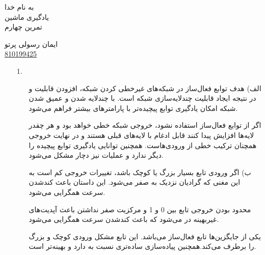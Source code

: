 \documentclass[a4paper]{article}
\begin{document}
\begin{center}
	\large
	 به نام خدا\\
 یادگیری ماشین\\
 تمرین چهارم
 
 \normalsize
 ایمان رسولی پرتو\\
 \underline{810199425}
\end{center}
\begin{itemize}
	\item [1.] ‌
	\begin{itemize}
		\item[الف)]
		هدف توابع فعال‌ساز در شبکه‌های 
		غیرخطی کردن شبکه، افزودن قابلیت 
		و در نتیجه ایجاد قابلیت چند‌لایه‌سازی شبکه است. با چندلایه شدن و عمیق شدن شبکه امکان یادگیری توابع پیچیده‌تر با پارامترهای بیشتر فراهم می‌شود.
		
		اگر از توابع فعال‌ساز استفاده نشود، خروجی شبکه خطی خواهد بود و هر چقدر لایه‌ها افزایش پیدا کنند قابل ادغام با لایه‌های قبلی هستند و در نهایت خروجی همچنان ترکیب خطی از ورودی‌هاست. همچنین توانایی یادگیری توابع پیچیده را دیگر ندارد و عملیات 
		نیز دچار مشکل می‌شود.
	\item[ب)]
	اگر ورودی تابع
	بسیار بزرگ یا کوچک باشد، تغییرات خروجی کم است به این مغنی که گرادیان نزدیک به صفر می‌شود. این داستان باعث کندشدن سرعت همگرایی می‌شود.
	
	محدود بودن خروجی تابع 
بین 0 و 1 و مرکزیت صفر نداشتن باعث آپدیت‌های غیربهینه در 
	می‌شود که باعث کندشدن سرعت همگرایی می‌شود.
	
	یکی از جایگزین‌ها تابع فعا‌ل‌ساز
	می‌باشد.‍ این تابع مشکل ورودی کوچک و بزرگ را برطرف می‌کند.همچنین پیاده‌سازی ساده‌تری نسبت به 
	دارد و بهینه‌تر است.
	

\end{itemize}
\end{itemize}
\end{document}
